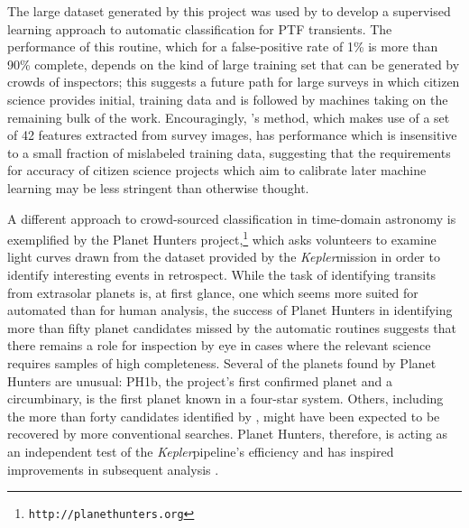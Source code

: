\documentclass{ar2e}
\def\url#1{\texttt{#1}}
\def\Kepler{{\it Kepler}}
\begin{document}
The large dataset generated by this project was used by \citet{Brink} to develop
a supervised learning approach to automatic classification for PTF transients.
The performance of this routine, which for a false-positive rate of 1\% is more
than 90\% complete, depends on the kind of large training set that can be
generated by crowds of inspectors; this suggests a future path for large surveys
in which citizen science provides initial, training data and is followed by
machines taking on the remaining bulk of the work. Encouragingly,
\citeauthor{Brink}'s method, which makes use of a set of 42 features extracted
from survey images, has performance which is insensitive to a small fraction of
mislabeled training data, suggesting that the requirements for accuracy of
citizen science projects which aim to calibrate later machine learning may be
less stringent than otherwise thought. 

A different approach to crowd-sourced classification in time-domain astronomy is
exemplified by the Planet Hunters
project,\footnote{\url{http://planethunters.org}} 
which asks volunteers to examine
light curves drawn from the dataset provided by the \Kepler mission in
order to identify interesting events in retrospect. While the task of
identifying transits from extrasolar planets is, at first glance, one which
seems more suited for automated than for human analysis, the success of Planet
Hunters in identifying more than fifty planet candidates missed by the automatic
routines suggests that there remains a role for inspection by eye in cases where
the relevant science requires samples of high completeness. Several of the
planets found by Planet Hunters are unusual: PH1b, the project's first confirmed
planet \citep{Schwamb++2013} and a circumbinary, is the first planet known in a
four-star system. 
Others, including the more than forty candidates identified 
by \citep{Wang++2013,Schmitt2014}, might have been
expected to be recovered by more conventional searches. Planet Hunters,
therefore, is acting as an independent test of the \Kepler pipeline's efficiency
\citep{Schwamb++2012} and has inspired improvements in subsequent analysis
\citep{Batalha++2013}. 

\end{document}

